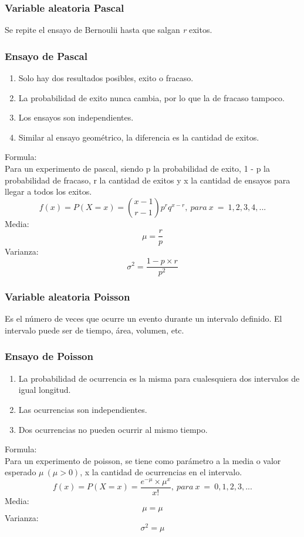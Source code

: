 \documentclass{article}
\begin{document}
\subsubsection{Variable aleatoria Pascal}
Se repite el ensayo de Bernoulii hasta que salgan \textit{r} exitos.

\subsubsection*{Ensayo de Pascal}
\begin{enumerate}
    \item Solo hay dos resultados posibles, exito o fracaso.
    \item La probabilidad de exito nunca cambia, por lo que la de fracaso tampoco.
    \item Los ensayos son independientes.
    \item Similar al ensayo geométrico, la diferencia es la cantidad de exitos.
\end{enumerate}
Formula:\\
Para un experimento de pascal, siendo p la probabilidad de exito, 1 - p la probabilidad de fracaso, r la cantidad de exitos y x la cantidad de ensayos para llegar a todos los exitos.\\
\[ f(x)=P(X=x)={x-1\choose r-1}p^{r}q^{x-r},\ para\ x\ =\ 1,2,3,4, ... \]
Media:\\
\[\mu=\frac{r}{p}\]
Varianza:
\[\sigma^{2}=\frac{1-p\times r}{p^{2}}\]

\subsubsection{Variable aleatoria Poisson}
Es el número de veces que ocurre un evento durante un intervalo definido. El intervalo puede ser de tiempo, área, volumen, etc.\\

\subsubsection*{Ensayo de Poisson}
\begin{enumerate}
    \item La probabilidad de ocurrencia es la misma para cualesquiera dos intervalos de igual longitud.
    \item Las ocurrencias son independientes.
    \item Dos ocurrencias no pueden ocurrir al mismo tiempo.
\end{enumerate}
Formula:\\
Para un experimento de poisson, se tiene como parámetro a la media o valor esperado $\mu\ (\mu>0)$, x la cantidad de ocurrencias en el intervalo. \\
\[ f(x)=P(X=x)={\frac{e^{-\mu}\times\mu^{x}}{x!}},\ para\ x\ =\ 0,1,2,3,...\]
Media:\\
\[\mu=\mu\]
Varianza:
\[\sigma^{2}=\mu\]
\end{document}
